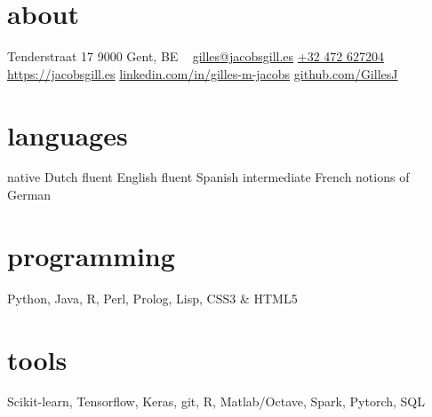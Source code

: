 \documentclass[]{friggeri-cv-a4}
\begin{document}

\begin{aside}
    \href{https://jacobsgill.es}{}
    \section{about}
        Tenderstraat 17
        9000 Gent, BE
        ~
        \href{mailto:gilles@jacobsgill.es}{gilles@jacobsgill.es}
        \href{tel:+32472627204}{+32 472 627204}
        ~
        \href{https://jacobsgill.es}{https://jacobsgill.es}
        \href{https://www.linkedin.com/in/gilles-m-jacobs/}{{linkedin.com/in/gilles-m-jacobs}}
        \href{https://github.com/GillesJ}{github.com/GillesJ}
    \section{languages}
        native Dutch
        fluent English
        fluent Spanish
        intermediate French
        notions of German
    \section{programming}
        Python, Java, R, Perl, Prolog, Lisp, CSS3 \& HTML5
    \section{tools}
     Scikit-learn, Tensorflow, Keras, git, R, Matlab/Octave, Spark, Pytorch, SQL
\end{aside}
\end{document}

